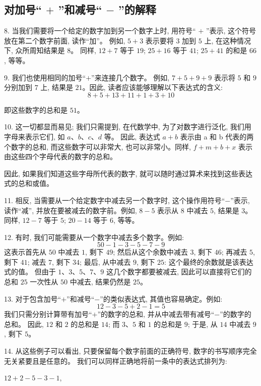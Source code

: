 \subsection{对加号“ $+$ ”和减号“ $-$ ”的解释}


8. 当我们需要将一个给定的数字加到另一个数字上时, 
	用符号“ $+$ ”表示, 这个符号放在第二个数字前面, 读作“加”。
	例如, $5 + 3$ 表示要将 $3$ 加到 $5$ 上, 在这种情况下, 众所周知结果是 $8$。
	同样, $12 + 7$ 等于 $19$; $25 + 16$ 等于 $41$; $25 + 41$ 的和是 $66$, 等等。
\par
9. 我们也使用相同的加号“$+$”来连接几个数字。
	例如, $7 + 5 + 9 + 9$ 表示将 $5$ 和 $9$ 分别加到 $7$ 上, 
	结果是 $21$。因此, 读者应该能够理解以下表达式的含义: 
\[
		8 + 5 + 13 + 11 + 1 + 3 + 10
\]\par
	即这些数字的总和是 $51$。
\par
10. 这一切都显而易见; 我们只需提到, 在代数学中, 为了对数字进行泛化, 	
	我们用字母来表示它们, 如 $a$、$b$、$c$、$d$ 等。
	因此, 表达式 $a + b$ 表示由 a 和 b 代表的两个数字的总和, 
	而这些数字可以非常大, 也可以非常小。同样, 
$f + m + b+ x$
表示由这些四个字母代表的数字的总和。
\par
	因此, 如果我们知道这些字母所代表的数字, 就可以随时通过算术来找到这些表达式的总和或值。
\par
11. 相反, 当需要从一个给定数字中减去另一个数字时, 这个操作用符号“$-$”表示, 读作“减”,
 并放在要被减去的数字前。例如, $8 - 5$ 表示从 $8$ 中减去 $5$, 结果是 $3$。同样, $12 - 7$ 等于 $5$; $20 - 14$ 等于 $6$, 等等。
\par
12. 有时, 我们可能需要从一个数字中减去多个数字。例如: 
\[
	50 - 1 - 3 - 5 - 7 - 9
\]
这表示首先从 $50$ 中减去 $1$, 剩下 $49$; 然后从这个余数中减去 $3$, 剩下 $46$; 
再减去 $5$, 剩下 $41$; 减去 $7$, 剩下 $34$; 最后, 从中减去 $9$, 剩下 $25$: 这个最终的余数就是该表达式的值。
但由于 $1$、$3$、$5$、$7$、$9$ 这几个数字都要被减去, 因此可以直接将它们的总和 $25$ 一次性从 $50$ 中减去, 结果仍然是 $25$。
\par
13. 对于包含加号“$+$”和减号“$-$”的类似表达式, 其值也容易确定。例如: 
\[
	12 - 3 - 5 + 2 - 1 = 5
\]
	我们只需分别计算带有加号“$+$”的数字的总和, 
	并从中减去带有减号“$-$”的数字的总和。
	因此, $12$ 和 $2$ 的总和是 $14$; 
	而 $3$、$5$ 和 $1$ 的总和是 $9$; 
	于是, 从 $14$ 中减去 $9$, 剩下 $5$。
\par
14. 从这些例子可以看出, 
	只要保留每个数字前面的正确符号, 
	数字的书写顺序完全无关紧要且是任意的。
	我们可以同样正确地将前一条中的表达式排列为: \par
	   $12 + 2 - 5 - 3 - 1$, \par
